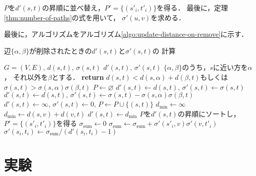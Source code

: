 $P$を$d'(s,t)$の昇順に並べ替え，$P'=\{(s'_i,t'_i)\}$を得る．
最後に，定理\ref{thm:number-of-paths}の式を用いて，
$\sigma'(u,v)$を求める．

最後に，アルゴリズムをアルゴリズム\ref{algo:update-distance-on-remove}に示す．
\begin{algorithm}
  \caption{辺$\{\alpha,\beta\}$が削除されたときの$d'(s,t)$と$\sigma'(s,t)$の
  計算}\label{algo:update-distance-on-remove}
  \begin{algorithmic}[1]
    \Require $G=(V,E),\,d(s,t),\,\sigma(s,t)$
    \Ensure $d'(s,t),\,\sigma'(s,t)$
    \State $\{\alpha,\beta\}$のうち，$s$に近い方を$\alpha$，
    それ以外を$\beta$とする．
    \State \textbf{return} $d(s,t)<d(s,\alpha)+d(\beta,t)$もしくは
    $\sigma(s,t)>\sigma(s,\alpha)\sigma(\beta,t)$
    \EndProcedure
    \State $P\gets\varnothing$
    \State $d'(s,t)\gets d(s,t),\,\sigma'(s,t)\gets\sigma(s,t)$
    \State $d'(s,t)\gets d(s,t),\,\sigma'(s,t)\gets\sigma(s,t)
    -\sigma(s,\alpha)\sigma(\beta,t)$
    \Else{}
    \State $d'(s,t)\gets\infty,\,\sigma'(s,t)\gets0,\,P\gets P\cup\{(s,t)\}$
    \EndIf
    \EndFor
    \State $d_{\min}\gets\infty$
    \State $d_{\min}\gets d(s,v)+d(v,t)$
    \EndIf
    \EndIf
    \EndFor
    \State $d'(s,t)\gets d_{\min}$
    \EndFor
    \State $P$を$d'(s,t)$の昇順にソートし，$P'=\{(s'_i,t'_i)\}$を得る
    \State $\sigma_{\mathrm{sum}}\gets0$
    \State $\sigma_{\mathrm{sum}}\gets
    \sigma_{\mathrm{sum}}+\sigma'(s'_i,v)\sigma'(v,t'_i)$
    \EndIf
    \EndFor
    \State $\sigma'(s_i,t_i)\gets\sigma_{\mathrm{sum}}/(d'(s_i,t_i)-1)$
    \EndFor
    \EndProcedure
  \end{algorithmic}
\end{algorithm}

\section{実験}

